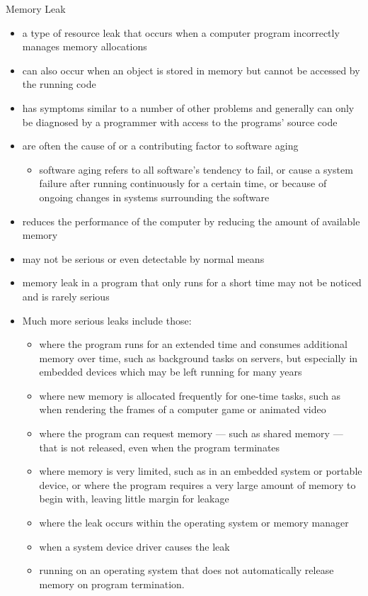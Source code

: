\documentclass[10pt,t]{beamer}
\begin{document}
\begin{frame}[allowframebreaks]{Memory Leak}
  \begin{itemize}
  \item a type of resource leak that occurs when a computer program incorrectly manages memory allocations
  \item can also occur when an object is stored in memory but cannot be accessed by the running code
  \item has symptoms similar to a number of other problems and generally can only be diagnosed by a programmer with access to the programs' source code
  \item are often the cause of or a contributing factor to software aging
    \begin{itemize}
      \item software aging refers to all software's tendency to fail, or cause a system failure after running continuously for a certain time, or because of ongoing changes in systems surrounding the software
    \end{itemize}
  \item reduces the performance of the computer by reducing the amount of available memory
  \item may not be serious or even detectable by normal means
  \item memory leak in a program that only runs for a short time may not be noticed and is rarely serious
  \item Much more serious leaks include those:
    \begin{itemize}
    \item where the program runs for an extended time and consumes additional memory over time, such as background tasks on servers, but especially in embedded devices which may be left running for many years
    \item where new memory is allocated frequently for one-time tasks, such as when rendering the frames of a computer game or animated video
    \item where the program can request memory — such as shared memory — that is not released, even when the program terminates
    \item where memory is very limited, such as in an embedded system or portable device, or where the program requires a very large amount of memory to begin with, leaving little margin for leakage
    \item where the leak occurs within the operating system or memory manager
    \item when a system device driver causes the leak
    \item running on an operating system that does not automatically release memory on program termination.
    \end{itemize}
  \end{itemize}
\end{frame}
\end{document}
